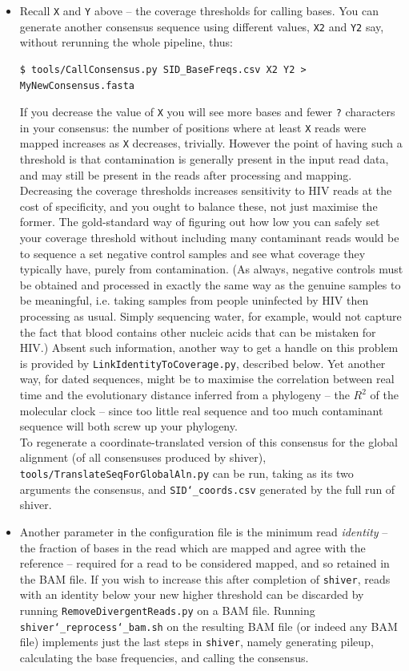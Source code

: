 \documentclass{article}
\newcommand{\shiv}{\c{shiver}\xspace}
\let\c\texttt
\begin{document}
\begin{itemize}

\item Recall \c{X} and \c{Y} above -- the coverage thresholds for calling bases.
You can generate another consensus sequence using different values, \c{X2} and \c{Y2} say, without rerunning the whole pipeline, thus:
\begin{Verbatim}[samepage=true]
$ tools/CallConsensus.py SID_BaseFreqs.csv X2 Y2 > MyNewConsensus.fasta
\end{Verbatim}
If you decrease the value of \c{X} you will see more bases and fewer \c{?} characters in your consensus: the number of positions where at least \c{X} reads were mapped increases as \c{X} decreases, trivially.
However the point of having such a threshold is that contamination is generally present in the input read data, and may still be present in the reads after processing and mapping.
Decreasing the coverage thresholds increases sensitivity to HIV reads at the cost of specificity, and you ought to balance these, not just maximise the former.
The gold-standard way of figuring out how low you can safely set your coverage threshold without including many contaminant reads would be to sequence a set negative control samples and see what coverage they typically have, purely from contamination.
(As always, negative controls must be obtained and processed in exactly the same way as the genuine samples to be meaningful, i.e. taking samples from people uninfected by HIV then processing as usual.
Simply sequencing water, for example, would not capture the fact that blood contains other nucleic acids that can be mistaken for HIV.)
Absent such information, another way to get a handle on this problem is provided by \c{LinkIdentityToCoverage.py}, described below.
Yet another way, for dated sequences, might be to maximise the correlation between real time and the evolutionary distance inferred from a phylogeny -- the $R^2$ of the molecular clock -- since too little real sequence and too much contaminant sequence will both screw up your phylogeny.\\
To regenerate a coordinate-translated version of this consensus for the global alignment (of all consensuses produced by shiver), \c{tools/TranslateSeqForGlobalAln.py} can be run, taking as its two arguments the consensus, and \c{SID\char`_coords.csv} generated by the full run of shiver.

\item Another parameter in the configuration file is the minimum read {\it identity} -- the fraction of bases in the read which are mapped and agree with the reference -- required for a read to be considered mapped, and so retained in the BAM file.
If you wish to increase this after completion of \shiv, reads with an identity below your new higher threshold can be discarded by running \c{RemoveDivergentReads.py} on a BAM file.
Running \c{shiver\char`_reprocess\char`_bam.sh} on the resulting BAM file (or indeed any BAM file) implements just the last steps in \shiv, namely generating pileup, calculating the base frequencies, and calling the consensus.


\end{itemize}
\end{document}
